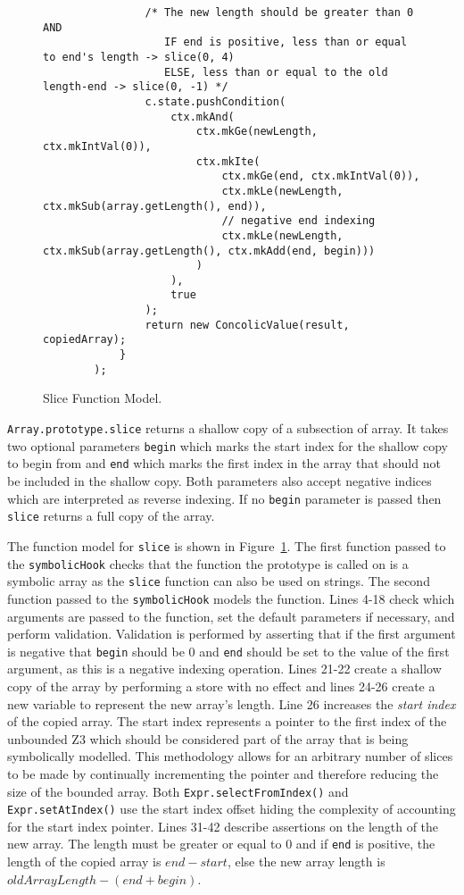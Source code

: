 \documentclass[]{final_report}
\begin{document}
\begin{figure}[t]
\begin{lstlisting}
                /* The new length should be greater than 0 AND 
                   IF end is positive, less than or equal to end's length -> slice(0, 4)
                   ELSE, less than or equal to the old length-end -> slice(0, -1) */
                c.state.pushCondition(
                    ctx.mkAnd(
                        ctx.mkGe(newLength, ctx.mkIntVal(0)), 
                        ctx.mkIte(
                            ctx.mkGe(end, ctx.mkIntVal(0)), 
                            ctx.mkLe(newLength, ctx.mkSub(array.getLength(), end)),
                            // negative end indexing 
                            ctx.mkLe(newLength, ctx.mkSub(array.getLength(), ctx.mkAdd(end, begin)))
                        )
                    ),
                    true
                );
                return new ConcolicValue(result, copiedArray);             
            }
        );
\end{lstlisting}
\caption{\label{fig:slice-func-model} Slice Function Model.}
\end{figure}

\lstinline|Array.prototype.slice| returns a shallow copy of a subsection of array. It takes two optional parameters \lstinline|begin| which marks the start index for the shallow copy to begin from and \lstinline|end| which marks the first index in the array that should not be included in the shallow copy. Both parameters also accept negative indices which are interpreted as reverse indexing. If no \lstinline{begin} parameter is passed then \lstinline{slice} returns a full copy of the array.

The function model for \lstinline|slice| is shown in Figure~\ref{fig:slice-func-model}. The first function passed to the \lstinline|symbolicHook| checks that the function the prototype is called on is a symbolic array as the \lstinline|slice| function can also be used on strings. The second function passed to the \lstinline|symbolicHook| models the function. Lines 4-18 check which arguments are passed to the function, set the default parameters if necessary, and perform validation. Validation is performed by asserting that if the first argument is negative that \lstinline|begin| should be 0 and \lstinline|end| should be set to the value of the first argument, as this is a negative indexing operation. Lines 21-22 create a shallow copy of the array by performing a store with no effect and lines 24-26 create a new variable to represent the new array's length. Line 26 increases the \textit{start index} of the copied array. The start index represents a pointer to the first index of the unbounded Z3 which should be considered part of the array that is being symbolically modelled. This methodology allows for an arbitrary number of slices to be made by continually incrementing the pointer and therefore reducing the size of the bounded array. Both \lstinline|Expr.selectFromIndex()| and \lstinline|Expr.setAtIndex()| use the start index offset hiding the complexity of accounting for the start index pointer. Lines 31-42 describe assertions on the length of the new array. The length must be greater or equal to 0 and if \lstinline|end| is positive, the length of the copied array is $end - start$, else the new array length is $oldArrayLength - (end + begin)$.
\end{document}
